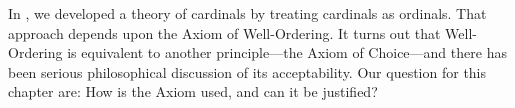 \documentclass[../../../include/open-logic-section]{subfiles}
\begin{document}


In , we
developed a theory of cardinals by treating cardinals as ordinals.
That approach depends upon the Axiom of Well-Ordering. It turns out
that Well-Ordering is equivalent to another principle---the Axiom of
Choice---and there has been serious philosophical discussion of its
acceptability. Our question for this chapter are: How is the Axiom
used, and can it be justified?
\end{document}

